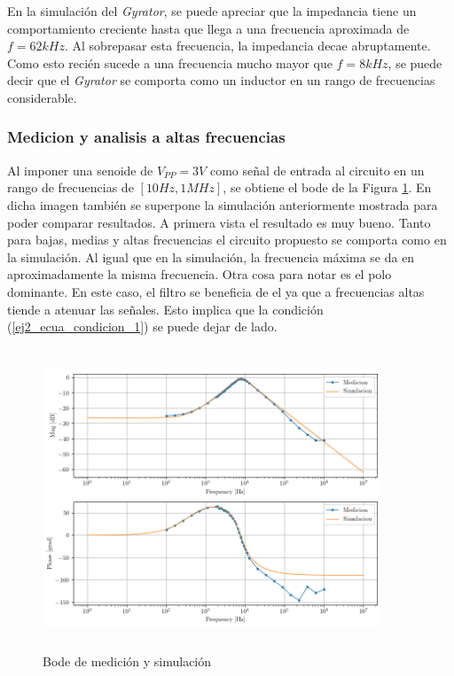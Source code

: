 En la simulación del \textit{Gyrator}, se puede apreciar que la impedancia tiene un comportamiento creciente hasta que llega a una frecuencia aproximada de $f = 62 kHz$. Al sobrepasar esta frecuencia, la impedancia decae abruptamente. Como esto recién sucede a una frecuencia mucho mayor que $f=8kHz$, se puede decir que el \textit{Gyrator} se comporta como un inductor en un rango de frecuencias considerable. 

\subsubsection{Medicion y analisis a altas frecuencias}

Al imponer una senoide de $V_{PP} = 3V$ como señal de entrada al circuito en un rango de frecuencias de $[10Hz , 1MHz]$, se obtiene el bode de la Figura \ref{fig:ej2_hp_sim_y_medicion}. En dicha imagen también se superpone la simulación anteriormente mostrada para poder comparar resultados. A primera vista el resultado es muy bueno. Tanto para bajas, medias y altas frecuencias el circuito propuesto se comporta como en la simulación. Al igual que en la simulación, la frecuencia máxima se da en aproximadamente la misma frecuencia. Otra cosa para notar es el polo dominante. En este caso, el filtro se beneficia de el ya que a frecuencias altas tiende a atenuar las señales. Esto implica que la condición (\ref{ej2_ecua_condicion_1}) se puede dejar de lado.  

\begin{figure}[h!]                                                       
    \centering\includegraphics[width=0.9\textwidth, height=9cm]{../Ex2/Resources/ej2_bp_med_and_sim.png}
    \caption{Bode de medición y simulación}
    \label{fig:ej2_hp_sim_y_medicion}
    \end{figure}

